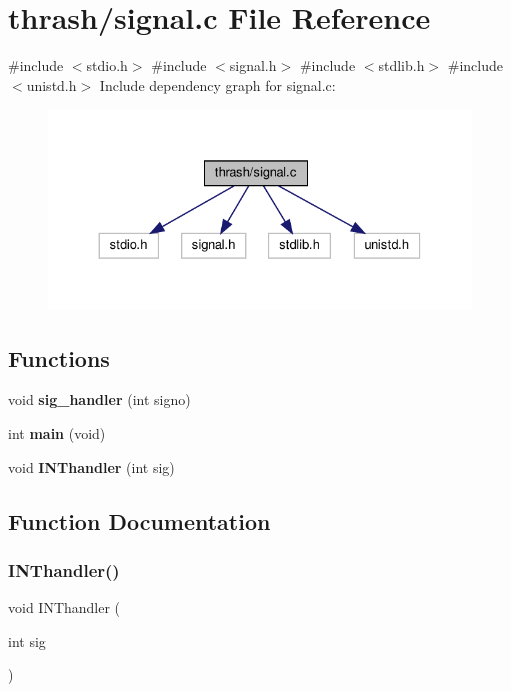 \section{thrash/signal.c File Reference}
\label{signal_8c}
{\ttfamily \#include $<$stdio.\+h$>$}\newline
{\ttfamily \#include $<$signal.\+h$>$}\newline
{\ttfamily \#include $<$stdlib.\+h$>$}\newline
{\ttfamily \#include $<$unistd.\+h$>$}\newline
Include dependency graph for signal.\+c\+:
\nopagebreak
\begin{figure}[H]
\begin{center}
\leavevmode
\includegraphics[width=330pt]{signal_8c__incl}
\end{center}
\end{figure}
\subsection*{Functions}
\begin{DoxyCompactItemize}
\item 
void \textbf{ sig\+\_\+handler} (int signo)
\item 
int \textbf{ main} (void)
\item 
void \textbf{ I\+N\+Thandler} (int sig)
\end{DoxyCompactItemize}


\subsection{Function Documentation}
\mbox{\label{signal_8c_a6a3869251603ae4e569abadbd7dab11c}} 
\subsubsection{I\+N\+Thandler()}
{\footnotesize\ttfamily void I\+N\+Thandler (\begin{DoxyParamCaption}\item[{int}]{sig }\end{DoxyParamCaption})}

